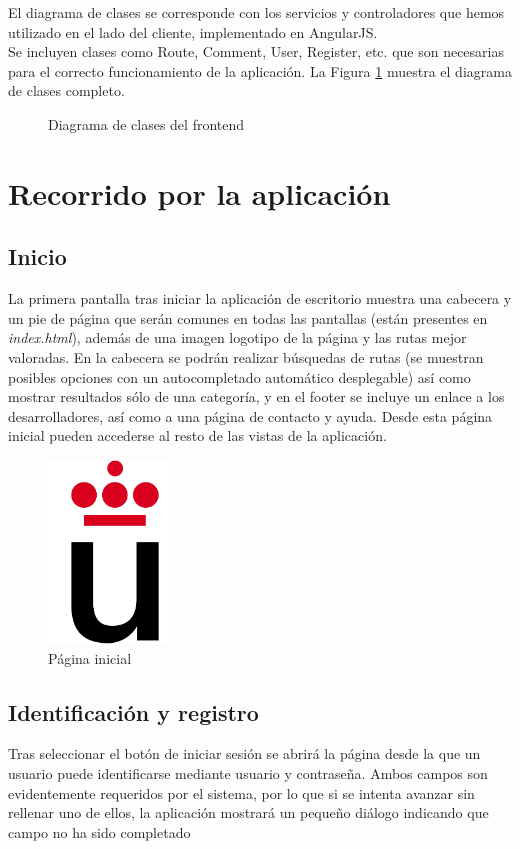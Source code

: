 \documentclass[11pt,a4paper]{article}
\begin{document}
El diagrama de clases se corresponde con los servicios y controladores que hemos utilizado en el lado del cliente, implementado en AngularJS.\\

Se incluyen clases como Route, Comment, User, Register, etc. que son necesarias para el correcto funcionamiento de la aplicación. La Figura \ref{fig:clasesfrontend} muestra el diagrama de clases completo.

\begin{figure}
\centering
\clasesfrontend
\caption{Diagrama de clases del frontend}
\label{fig:clasesfrontend}
\end{figure}


\clearpage

\section{Recorrido por la aplicación}
\subsection{Inicio}
La primera pantalla tras iniciar la aplicación de escritorio muestra una cabecera y un pie de página que serán comunes en todas las pantallas (están presentes en \textit{index.html}), además de una imagen logotipo de la página y las rutas mejor valoradas. En la cabecera se podrán realizar búsquedas de rutas (se muestran posibles opciones con un autocompletado automático desplegable) así como mostrar resultados sólo de una categoría, y en el footer se incluye un enlace a los desarrolladores, así como a una página de contacto y ayuda. Desde esta página inicial pueden accederse al resto de las vistas de la aplicación.
\begin{figure}[h]
\centering
  \includegraphics[width=0.3\textwidth]{./imagenes/logoURJC}
  \caption{Página inicial}
  \label{fig: Página inicial}
\end{figure}
\subsection{Identificación y registro}
Tras seleccionar el botón de iniciar sesión se abrirá la página desde la que un usuario puede identificarse mediante usuario y contraseña. Ambos campos son evidentemente requeridos por el sistema, por lo que si se intenta avanzar sin rellenar uno de ellos, la aplicación mostrará un pequeño diálogo indicando que campo no ha sido completado
\end{document}
